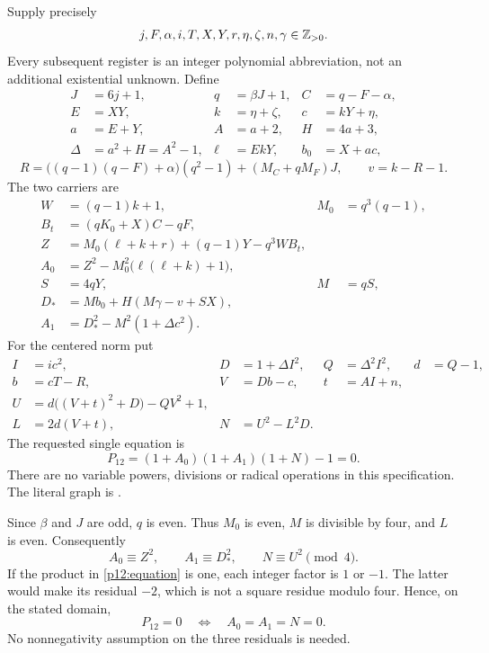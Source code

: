 Supply precisely
\[
 j,F,\alpha,i,T,X,Y,r,\eta,\zeta,n,\gamma\in\mathbb Z_{>0}.
\]
Every subsequent register is an integer polynomial abbreviation, not an
additional existential unknown. Define
\begin{align*}
 J&=6j+1,& q&=\beta J+1,& C&=q-F-\alpha,\\
 E&=XY,& k&=\eta+\zeta,& c&=kY+\eta,\\
 a&=E+Y,& A&=a+2,& H&=4a+3,\\
 \Delta&=a^2+H=A^2-1,& \ell&=EkY,& b_0&=X+ac,
\end{align*}
\[
 R=\bigl((q-1)(q-F)+\alpha\bigr)(q^2-1)
                              +(M_C+qM_F)J,\qquad v=k-R-1.
\]
The two carriers are
\begin{align}
 W&=(q-1)k+1,& M_0&=q^3(q-1),\nonumber\\
 B_t&=(qK_0+X)C-qF,\nonumber\\
 Z&=M_0(\ell+k+r)+(q-1)Y-q^3WB_t,\nonumber\\
 A_0&=Z^2-M_0^2\bigl(\ell(\ell+k)+1\bigr),
                                                   \label{p12:first}\\
 S&=4qY,& M&=qS,\nonumber\\
 D_*&=Mb_0+H(M\gamma-v+SX),\nonumber\\
 A_1&=D_*^2-M^2(1+\Delta c^2).             \label{p12:main}
\end{align}
For the centered norm put
\begin{align}
 I&=ic^2,& D&=1+\Delta I^2,& Q&=\Delta^2I^2,& d&=Q-1,
                                                       \nonumber\\
 b&=cT-R,& V&=Db-c,& t&=AI+n,               \label{p12:auxreg}\\
 U&=d\bigl((V+t)^2+D\bigr)-QV^2+1,\nonumber\\
 L&=2d(V+t),& N&=U^2-L^2D.                 \label{p12:norm}
\end{align}
The requested single equation is
\begin{equation}
 \boxed{P_{12}=(1+A_0)(1+A_1)(1+N)-1=0.}    \label{p12:equation}
\end{equation}
There are no variable powers, divisions or radical operations in this
specification. The literal graph is
.

Since $\beta$ and $J$ are odd, $q$ is even. Thus $M_0$ is even, $M$ is
divisible by four, and $L$ is even. Consequently
\[
 A_0\equiv Z^2,\qquad A_1\equiv D_*^2,\qquad N\equiv U^2\pmod4.
\]
If the product in \eqref{p12:equation} is one, each integer factor is
$1$ or $-1$. The latter would make its residual $-2$, which is not a
square residue modulo four. Hence, on the stated domain,
\begin{equation}
 P_{12}=0\quad\Longleftrightarrow\quad A_0=A_1=N=0.
                                                        \label{p12:unit}
\end{equation}
No nonnegativity assumption on the three residuals is needed.

